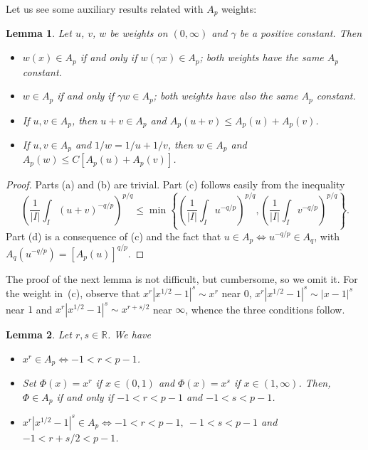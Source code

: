 \documentclass[reqno]{amsart}
\theoremstyle{plain}
\newtheorem{Lem}{Lemma}
\theoremstyle{definition}
\theoremstyle{remark}
\begin{document}
Let us see some auxiliary results related with $A_p$ weights:

\begin{Lem}
\label{lem:Ap1}
Let $u$, $v$, $w$ be weights on $(0, \infty)$ and $\gamma$ be a positive
constant. Then
\begin{itemize}
\item[(a)] $w(x) \in A_p$ if and only if $w(\gamma x) \in A_p$;
both weights have the same $A_p$ constant.
\item[(b)] $w \in A_p$ if and only if $\gamma w \in A_p$; both weights
have also the same $A_p$ constant.
\item[(c)] If $u, v \in A_p$, then $u + v \in A_p$ and
$A_p(u + v) \le A_p(u) + A_p(v)$.
\item[(d)] If $u, v \in A_p$ and $1/w = 1/u + 1/v$, then $w \in A_p$
and $A_p(w) \le C [A_p(u) + A_p(v)]$.
\end{itemize}
\end{Lem}

\begin{proof}
Parts (a) and (b) are trivial. Part (c) follows easily from
the inequality
\begin{equation*}
   \left(
   \frac1{|I|} \int_I (u + v)^{-{q/p}} \right)^{p/q}
   \le
   \min\left\{
   \left( \frac1{|I|} \int_I u^{-{q/p}} \right)^{p/q},
   \left( \frac1{|I|} \int_I v^{-{q/p}} \right)^{p/q}
   \right\}.
\end{equation*}
Part (d) is a consequence of (c) and the fact that $u \in A_p \iff
u^{-q/p} \in A_{q}$, with $A_{q}(u^{-q/p}) = [A_p(u)]^{q/p}$.
\end{proof}

The proof of the next lemma is not difficult, but cumbersome, so we omit it.
For the weight in~(c), observe that $x^r |x^{1/2} - 1|^s \sim x^r$ near
$0$, $x^r |x^{1/2} - 1|^s \sim |x-1|^s$ near $1$ and $x^r |x^{1/2} - 1|^s \sim
x^{r+s/2}$ near $\infty$, whence the three conditions follow.

\begin{Lem}
\label{lem:Ap2}
Let $r, s \in \mathbb{R}$. We have
\begin{itemize}
\item[(a)] $x^r \in A_p \iff -1 < r < p-1$.
\item[(b)] Set $\Phi(x) = x^r$ if $x \in (0,1)$ and $\Phi(x) = x^s$ if $x
\in (1,\infty)$. Then, $\Phi \in A_p$ if and only if $-1 < r < p-1$ and $-1 <
s < p-1$.
\item[(c)] $x^r |x^{1/2} - 1|^s \in A_p \iff -1 < r < p-1, \ -1 < s < p-1$ and
$-1 < r + s/2 < p-1$.
\end{itemize}
\end{Lem}
\end{document}
